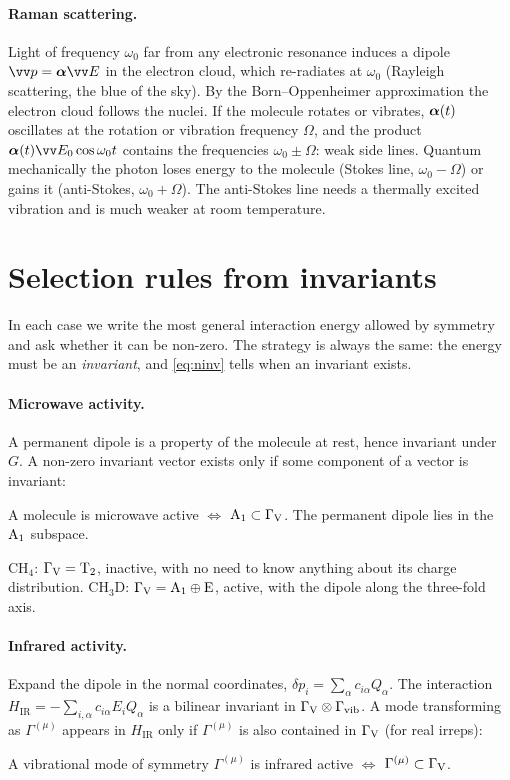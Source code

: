 \paragraph{Raman scattering.} Light of frequency $\omega_0$ far from any electronic
resonance induces a dipole $\vec{p}=\mat{\alpha}\vec{E}$ in the electron cloud, which
re-radiates at $\omega_0$ (Rayleigh scattering, the blue of the sky). By the
Born--Oppenheimer approximation the electron cloud follows the nuclei. If the molecule
rotates or vibrates, $\bm{\alpha}(t)$ oscillates at the rotation or vibration
frequency $\Omega$, and the product $\mat{\alpha}(t)\vec{E}_0\cos\omega_0t$ contains the
frequencies $\omega_0\pm\Omega$: weak side lines. Quantum mechanically the photon
loses energy to the molecule (Stokes line, $\omega_0-\Omega$) or gains it
(anti-Stokes, $\omega_0+\Omega$). The anti-Stokes line needs a thermally excited
vibration and is much weaker at room temperature.

\section{Selection rules from invariants}\label{sec:raman}

In each case we write the most general interaction energy allowed by symmetry and
ask whether it can be non-zero. The strategy is always the same: the energy must be an
\emph{invariant}, and \eqref{eq:ninv} tells when an invariant exists.

\paragraph{Microwave activity.} A permanent dipole is a property of the molecule at
rest, hence invariant under $G$. A non-zero invariant vector exists only if some
component of a vector is invariant:
\begin{keyresult}
A molecule is microwave active $\iff$ $\mathrm{A}_1\subset\Gamma_{\mathrm{V}}$. The permanent dipole lies
in the $\mathrm{A}_1$ subspace.
\end{keyresult}
$\mathrm{CH_4}$: $\Gamma_{\mathrm{V}}=\mathrm{T}_2$, inactive, with no need to know anything about its
charge distribution. $\mathrm{CH_3D}$: $\Gamma_{\mathrm{V}}=\mathrm{A}_1\oplus\mathrm{E}$, active, with the
dipole along the three-fold axis.

\paragraph{Infrared activity.} Expand the dipole in the normal coordinates,
$\delta p_i=\sum_\alpha c_{i\alpha}Q_\alpha$. The interaction
$H_{\mathrm{IR}}=-\sum_{i,\alpha}c_{i\alpha}E_iQ_\alpha$ is a bilinear invariant in
$\Gamma_{\mathrm{V}}\otimes\Gamma_{\mathrm{vib}}$. A mode transforming as $\Gamma^{(\mu)}$ appears in $H_{\mathrm{IR}}$
only if $\Gamma^{(\mu)}$ is also contained in $\Gamma_{\mathrm{V}}$ (for real irreps):
\begin{keyresult}
A vibrational mode of symmetry $\Gamma^{(\mu)}$ is infrared active $\iff$
$\Gamma^{(\mu)}\subset\Gamma_{\mathrm{V}}$.
\end{keyresult}


